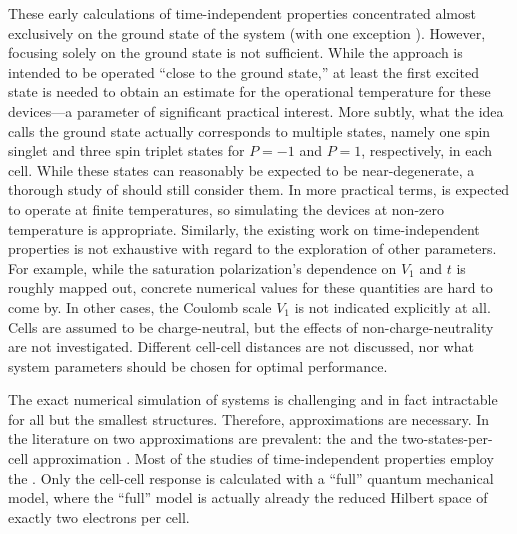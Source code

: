These early calculations of time-independent  properties concentrated
almost exclusively on the ground state of the system (with one exception
\cite{tougaw1993bistable}). However, focusing solely on the ground state is not
sufficient. While the  approach is intended to be operated ``close to
the ground state,'' at least the first excited state is needed to obtain an
estimate for the operational temperature for these devices---a parameter of
significant practical interest. More subtly, what the  idea calls the
ground state actually corresponds to multiple states, namely one spin singlet
and three spin triplet states for $P=-1$ and $P=1$, respectively, in each cell.
While these states can reasonably be expected to be near-degenerate, a thorough
study of  should still consider them. In more practical terms,
 is expected to operate at finite temperatures, so simulating the
devices at non-zero temperature is appropriate. Similarly, the existing work on
time-independent  properties is not exhaustive with regard to the
exploration of other parameters. For example, while the saturation
polarization's dependence on $V_1$ and $t$ is roughly mapped out, concrete
numerical values for these quantities are hard to come by.  In other cases, the
Coulomb scale $V_1$ is not indicated explicitly at all.  Cells are assumed to be
charge-neutral, but the effects of non-charge-neutrality are not investigated.
Different cell-cell distances are not discussed, nor what system parameters
should be chosen for optimal performance.

The exact numerical simulation of  systems is challenging and in fact
intractable for all but the smallest structures. Therefore, approximations are
necessary. In the literature on  two approximations are prevalent: the
 and the two-states-per-cell approximation \cite{lent1993quantum,
tougaw1996dynamic}. Most of the studies of time-independent 
properties employ the . Only the cell-cell response is calculated
with a ``full'' quantum mechanical model, where the ``full'' model is actually
already the reduced Hilbert space of exactly two electrons per cell. 

